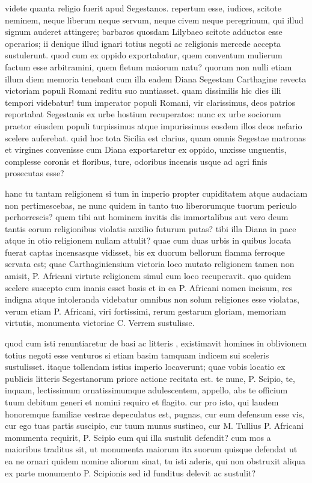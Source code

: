 videte quanta religio fuerit apud Segestanos. repertum esse, iudices, scitote neminem, neque liberum neque servum, neque civem neque peregrinum, qui illud signum auderet attingere; barbaros quosdam Lilybaeo scitote adductos esse operarios; ii denique illud ignari totius negoti ac religionis mercede accepta sustulerunt. quod cum ex oppido exportabatur, quem conventum mulierum factum esse arbitramini, quem fletum maiorum natu? quorum non nulli etiam illum diem memoria tenebant cum illa eadem Diana Segestam Carthagine revecta victoriam populi Romani reditu suo nuntiasset. quam dissimilis hic dies illi tempori videbatur! tum imperator populi Romani, vir clarissimus, deos patrios reportabat Segestanis ex urbe hostium recuperatos: nunc ex urbe sociorum praetor eiusdem populi turpissimus atque impurissimus eosdem illos deos nefario scelere auferebat. quid hoc tota Sicilia est clarius, quam omnis Segestae matronas et virgines convenisse cum Diana exportaretur ex oppido, unxisse unguentis, complesse coronis et floribus, ture, odoribus incensis usque ad agri finis prosecutas esse?

 hanc tu tantam religionem si tum in imperio propter cupiditatem atque audaciam non pertimescebas, ne nunc quidem in tanto tuo liberorumque tuorum periculo perhorrescis? quem tibi aut hominem invitis dis immortalibus aut vero deum tantis eorum religionibus violatis auxilio futurum putas? tibi illa Diana in pace atque in otio religionem nullam attulit? quae cum duas urbis in quibus locata fuerat captas incensasque vidisset, bis ex duorum bellorum flamma ferroque servata est; quae Carthaginiensium victoria loco mutato religionem tamen non amisit, P. Africani virtute religionem simul cum loco recuperavit. quo quidem scelere suscepto cum inanis esset basis et in ea P. Africani nomen incisum, res indigna atque intoleranda videbatur omnibus non solum religiones esse violatas, verum etiam P. Africani, viri fortissimi, rerum gestarum gloriam, memoriam virtutis, monumenta victoriae C. Verrem sustulisse.

 quod cum isti renuntiaretur de basi ac litteris , existimavit homines in oblivionem totius negoti esse venturos si etiam basim tamquam indicem sui sceleris sustulisset. itaque tollendam istius imperio locaverunt; quae vobis locatio ex publicis litteris Segestanorum priore actione recitata est. te nunc, P. Scipio, te, inquam, lectissimum ornatissimumque adulescentem, appello, abs te officium tuum debitum generi et nomini requiro et flagito. cur pro isto, qui laudem honoremque familiae vestrae depeculatus est, pugnas, cur eum defensum esse vis, cur ego tuas partis suscipio, cur tuum munus sustineo, cur M. Tullius P. Africani monumenta requirit, P. Scipio eum qui illa sustulit defendit? cum mos a maioribus traditus sit, ut monumenta maiorum ita suorum quisque defendat ut ea ne ornari quidem nomine aliorum sinat, tu isti aderis, qui non obstruxit aliqua ex parte monumento P. Scipionis sed id funditus delevit ac sustulit?

